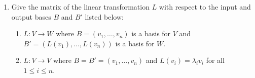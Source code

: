\begin{enumerate}
\item Give the matrix of the linear transformation $L$ with respect to the input and output bases $B$ and $B'$ listed below:
\begin{enumerate}
\item $L:V\rightarrow W$ where $B=(v_1,\ldots, v_n)$ is a basis for $V$ and $B'=(L(v_1),\ldots, L(v_n))$ is a basis for $W$.
\item $L:V\rightarrow V$ where $B=B'=(v_1,\ldots,v_n)$ and $L(v_i)=\lambda_i v_i$ for all~$1\leq i\leq n$.
\end{enumerate}


\end{enumerate}

